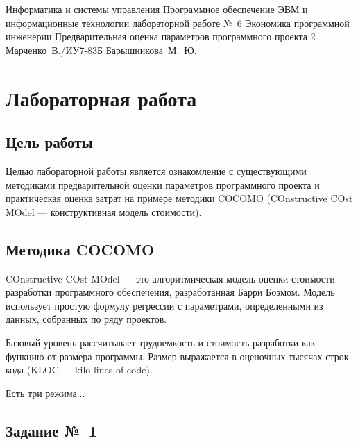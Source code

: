 \documentclass{bmstu}
\begin{document}
\makereporttitle
    {Информатика и системы управления}
    {Программное обеспечение ЭВМ и информационные технологии}
    {лабораторной работе №~6}
    {Экономика программной инженерии}
    {Предварительная оценка параметров программного проекта}
    {2}
    {Марченко~В./ИУ7-83Б}
    {Барышникова~М.~Ю.}

{\centering \maketableofcontents}

\chapter{Лабораторная работа}

\section{Цель работы}

Целью лабораторной работы является ознакомление с существующими методиками предварительной оценки параметров программного проекта и практическая оценка затрат на примере методики COCOMO (COnstructive COst MOdel --- конструктивная модель стоимости).

\section{Методика COCOMO}

COnstructive COst MOdel --- это алгоритмическая модель оценки стоимости разработки программного обеспечения, разработанная Барри Боэмом. 
Модель использует простую формулу регрессии с параметрами, определенными из данных, собранных по ряду проектов.

Базовый уровень рассчитывает трудоемкость и стоимость разработки как функцию от размера программы. Размер выражается в оценочных тысячах строк кода (KLOC --- kilo lines of code).

Есть три режима...
    
\section{Задание №~1}
\end{document}
